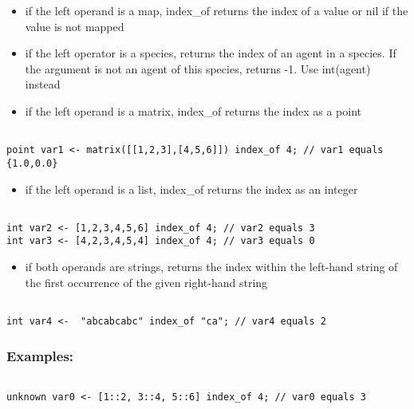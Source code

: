 \documentclass[]{book}
\providecommand{\tightlist}{%
  \setlength{\itemsep}{0pt}\setlength{\parskip}{0pt}}
\theoremstyle{definition}
\theoremstyle{definition}
\theoremstyle{definition}
\theoremstyle{remark}
\begin{document}
\begin{itemize}
\tightlist
\item
  if the left operand is a map, index\_of returns the index of a value
  or nil if the value is not mapped\\
\item
  if the left operator is a species, returns the index of an agent in a
  species. If the argument is not an agent of this species, returns -1.
  Use int(agent) instead\\
\item
  if the left operand is a matrix, index\_of returns the index as a
  point
\end{itemize}

\begin{verbatim}
 
point var1 <- matrix([[1,2,3],[4,5,6]]) index_of 4; // var1 equals {1.0,0.0}
\end{verbatim}

\begin{itemize}
\tightlist
\item
  if the left operand is a list, index\_of returns the index as an
  integer
\end{itemize}

\begin{verbatim}
 
int var2 <- [1,2,3,4,5,6] index_of 4; // var2 equals 3 
int var3 <- [4,2,3,4,5,4] index_of 4; // var3 equals 0
\end{verbatim}

\begin{itemize}
\tightlist
\item
  if both operands are strings, returns the index within the left-hand
  string of the first occurrence of the given right-hand string
\end{itemize}

\begin{verbatim}
 
int var4 <-  "abcabcabc" index_of "ca"; // var4 equals 2
\end{verbatim}

\subsubsection{Examples:}\label{examples-208}

\begin{verbatim}
 
unknown var0 <- [1::2, 3::4, 5::6] index_of 4; // var0 equals 3
\end{verbatim}
\end{document}
